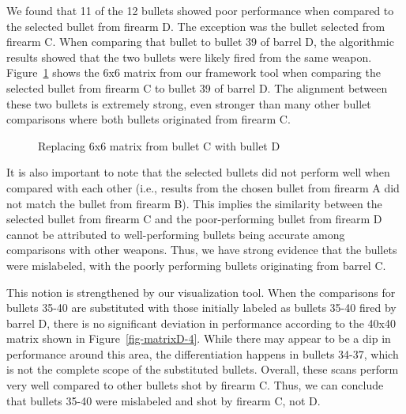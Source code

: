 \documentclass[
  number,
  preprint,
  5p,
  twocolumn]{elsarticle}
\begin{document}
We found that 11 of the 12 bullets showed poor performance when compared
to the selected bullet from firearm D. The exception was the bullet
selected from firearm C. When comparing that bullet to bullet 39 of
barrel D, the algorithmic results showed that the two bullets were
likely fired from the same weapon. Figure~\ref{fig-CD-Comparison} shows
the 6x6 matrix from our framework tool when comparing the selected
bullet from firearm C to bullet 39 of barrel D. The alignment between
these two bullets is extremely strong, even stronger than many other
bullet comparisons where both bullets originated from firearm C.

\begin{figure}


\caption{\label{fig-CD-Comparison}Replacing 6x6 matrix from bullet C
with bullet D}

\end{figure}%

It is also important to note that the selected bullets did not perform
well when compared with each other (i.e., results from the chosen bullet
from firearm A did not match the bullet from firearm B). This implies
the similarity between the selected bullet from firearm C and the
poor-performing bullet from firearm D cannot be attributed to
well-performing bullets being accurate among comparisons with other
weapons. Thus, we have strong evidence that the bullets were mislabeled,
with the poorly performing bullets originating from barrel C.

This notion is strengthened by our visualization tool. When the
comparisons for bullets 35-40 are substituted with those initially
labeled as bullets 35-40 fired by barrel D, there is no significant
deviation in performance according to the 40x40 matrix shown in
Figure~\ref{fig-matrixD-4}. While there may appear to be a dip in
performance around this area, the differentiation happens in bullets
34-37, which is not the complete scope of the substituted bullets.
Overall, these scans perform very well compared to other bullets shot by
firearm C. Thus, we can conclude that bullets 35-40 were mislabeled and
shot by firearm C, not D.
\end{document}
